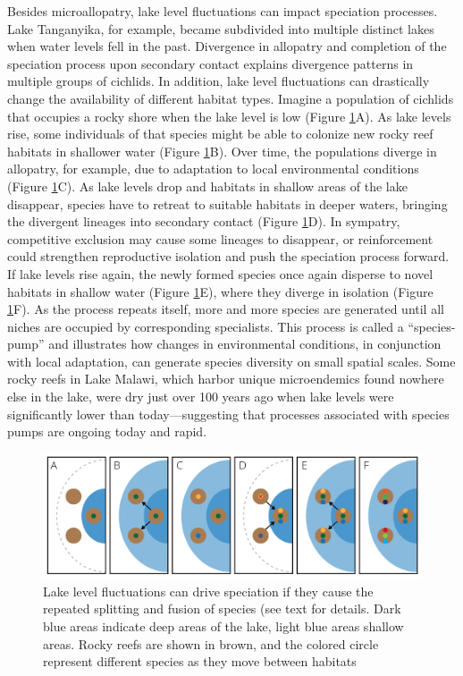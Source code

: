 \documentclass[
]{book}
\begin{document}
Besides microallopatry, lake level fluctuations can impact speciation processes. Lake Tanganyika, for example, became subdivided into multiple distinct lakes when water levels fell in the past. Divergence in allopatry and completion of the speciation process upon secondary contact explains divergence patterns in multiple groups of cichlids. In addition, lake level fluctuations can drastically change the availability of different habitat types. Imagine a population of cichlids that occupies a rocky shore when the lake level is low (Figure \ref{fig:speciespump}A). As lake levels rise, some individuals of that species might be able to colonize new rocky reef habitats in shallower water (Figure \ref{fig:speciespump}B). Over time, the populations diverge in allopatry, for example, due to adaptation to local environmental conditions (Figure \ref{fig:speciespump}C). As lake levels drop and habitats in shallow areas of the lake disappear, species have to retreat to suitable habitats in deeper waters, bringing the divergent lineages into secondary contact (Figure \ref{fig:speciespump}D). In sympatry, competitive exclusion may cause some lineages to disappear, or reinforcement could strengthen reproductive isolation and push the speciation process forward. If lake levels rise again, the newly formed species once again disperse to novel habitats in shallow water (Figure \ref{fig:speciespump}E), where they diverge in isolation (Figure \ref{fig:speciespump}F). As the process repeats itself, more and more species are generated until all niches are occupied by corresponding specialists. This process is called a ``species-pump'' and illustrates how changes in environmental conditions, in conjunction with local adaptation, can generate species diversity on small spatial scales. Some rocky reefs in Lake Malawi, which harbor unique microendemics found nowhere else in the lake, were dry just over 100 years ago when lake levels were significantly lower than today---suggesting that processes associated with species pumps are ongoing today and rapid.

\begin{figure}
\includegraphics[width=1\linewidth]{images/speciespump} \caption{Lake level fluctuations can drive speciation if they cause the repeated splitting and fusion of species (see text for details. Dark blue areas indicate deep areas of the lake, light blue areas shallow areas. Rocky reefs are shown in brown, and the colored circle represent different species  as they move between habitats }\label{fig:speciespump}
\end{figure}
\end{document}
